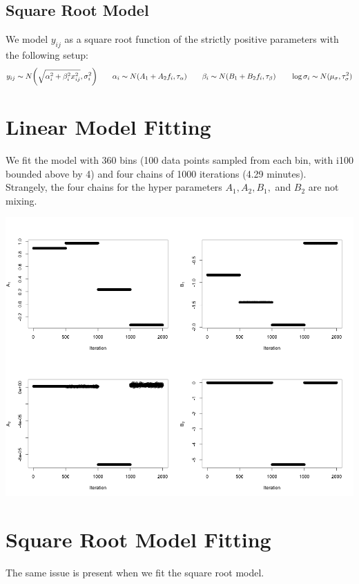 \documentclass[12pt]{article}
\begin{document}
\subsection{Square Root Model}
We model $y_{ij}$ as a square root function of the strictly positive parameters with the following setup:
$$y_{ij} \sim N \biggl( \sqrt{ \alpha_i^2 + \beta_i^2 x_{ij}^2} , \sigma_i^2 \biggr)
\hspace{20 pt} \alpha_i \sim N(A_1 + A_2 f_i, \tau_\alpha)
\hspace{20 pt} \beta_i \sim N(B_1 + B_2 f_i, \tau_\beta)
\hspace{20 pt} \log\sigma_i \sim N(\mu_\sigma,\tau_\sigma^2)$$


\pagebreak
\section{Linear Model Fitting}
We fit the model with 360 bins (100 data points sampled from each bin, with i100 bounded above by 4) and four chains of 1000 iterations (4.29 minutes).\\

\noindent Strangely, the four chains for the hyper parameters $A_1, A_2, B_1,$ and $B_2$ are not mixing.

 \includegraphics[scale=0.5]{HyperParams.png}

\pagebreak
\section{Square Root Model Fitting}
The same issue is present when we fit the square root model.
\end{document}
